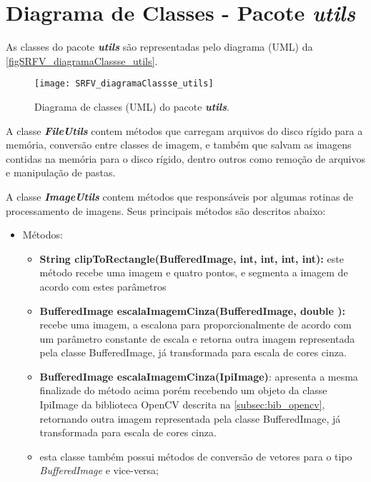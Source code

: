 \section{Diagrama de Classes - Pacote \textit{\textbf{utils}}}\label{sec:ituls}
As classes do pacote \textbf{\textit{utils}} são representadas pelo diagrama (UML) da \autoref{figSRFV_diagramaClassse_utils}. 

\begin{figure}[h]
	\centering
	\texttt{[image: SRFV\_diagramaClassse\_utils]}
	\caption{Diagrama de classes (UML) do pacote \textbf{\textit{utils}}.}
	\label{figSRFV_diagramaClassse_utils}
\end{figure}

A classe \textit{\textbf{FileUtils}} contem métodos que carregam arquivos do disco rígido para a memória, conversão entre classes de imagem, e também que salvam as imagens contidas na memória para o disco rígido, dentro outros como remoção de arquivos e manipulação de pastas.


A classe \textit{\textbf{ImageUtils}} contem métodos que responsáveis por algumas rotinas de processamento de imagens. Seus principais métodos são descritos abaixo:


\begin{itemize}	
	\item Métodos:
	\begin{itemize}
		\item \textbf{String clipToRectangle(BufferedImage, int, int, int, int):} este método recebe uma imagem e quatro pontos, e segmenta a imagem de acordo com estes parâmetros
		
		\item \textbf{BufferedImage escalaImagemCinza(BufferedImage, double ):} recebe uma imagem, a escalona para proporcionalmente de acordo com um parâmetro constante de escala e retorna outra imagem representada pela classe BufferedImage, já transformada para escala de cores cinza.
		
		\item \textbf{BufferedImage escalaImagemCinza(IpiImage)}: apresenta a mesma finalizade do método acima porém recebendo um objeto da classe IpiImage da biblioteca OpenCV descrita na \autoref{subsec:bib_opencv}, retornando outra imagem representada pela classe BufferedImage, já transformada para escala de cores cinza.
		
		\item esta classe também possui métodos de conversão de vetores para o tipo \textit{BufferedImage }e vice-versa;
	\end{itemize}
\end{itemize}


